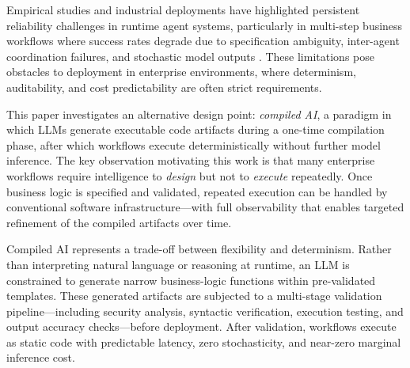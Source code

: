 \documentclass[11pt]{article}
\begin{document}
Empirical studies and industrial deployments have highlighted persistent reliability challenges in runtime agent systems, particularly in multi-step business workflows where success rates degrade due to specification ambiguity, inter-agent coordination failures, and stochastic model outputs \citep{cemri2025multiagent, atil2024nondeterminism}. These limitations pose obstacles to deployment in enterprise environments, where determinism, auditability, and cost predictability are often strict requirements.

This paper investigates an alternative design point: \emph{compiled AI}, a paradigm in which LLMs generate executable code artifacts during a one-time compilation phase, after which workflows execute deterministically without further model inference. The key observation motivating this work is that many enterprise workflows require intelligence to \emph{design} but not to \emph{execute} repeatedly. Once business logic is specified and validated, repeated execution can be handled by conventional software infrastructure---with full observability that enables targeted refinement of the compiled artifacts over time.

Compiled AI represents a trade-off between flexibility and determinism. Rather than interpreting natural language or reasoning at runtime, an LLM is constrained to generate narrow business-logic functions within pre-validated templates. These generated artifacts are subjected to a multi-stage validation pipeline—including security analysis, syntactic verification, execution testing, and output accuracy checks—before deployment. After validation, workflows execute as static code with predictable latency, zero stochasticity, and near-zero marginal inference cost.
\end{document}
